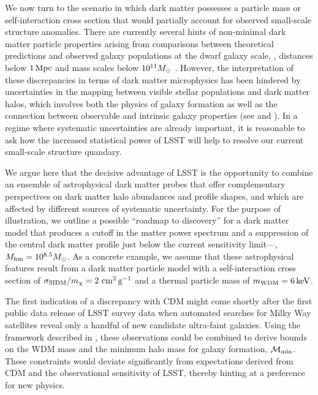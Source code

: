 We now turn to the scenario in which dark matter possesses a particle mass or self-interaction cross section that would partially account for observed small-scale structure anomalies.
There are currently several hints of non-minimal dark matter particle properties arising from comparisons between theoretical predictions and observed galaxy populations at the dwarf galaxy scale, \ie, distances below $1 \mathrm{\,Mpc}$ and mass scales below $10^{11} M_\odot$ \citep[reviewed by][]{BuckleyPeter:2017,Bullock:2017}.
However, the interpretation of these discrepancies in terms of dark matter microphysics has been hindered by uncertainties in the mapping between visible stellar populations and dark matter halos, which involves both the physics of galaxy formation as well as the connection between observable and intrinsic galaxy properties (see  and ).
In a regime where systematic uncertainties are already important, it is reasonable to ask how the increased statistical power of LSST will help to resolve our current small-scale structure quandary.

We argue here that the decisive advantage of LSST is the opportunity to combine an ensemble of astrophysical dark matter probes that offer complementary perspectives on dark matter halo abundances and profile shapes, and which are affected by different sources of systematic uncertainty.
For the purpose of illustration, we outline a possible ``roadmap to discovery'' for a dark matter model that produces a cutoff in the matter power spectrum and a suppression of the central dark matter profile just below the current sensitivity limit---\ie, $M_{\rm hm} = 10^{8.5}M_\odot$.
As a concrete example, we assume that these astrophysical features result from a dark matter particle model with a self-interaction cross section of $\sigma_{\rm SIDM}/m_\chi = 2 \mathrm{\,\mathrm{\,cm}^2\mathrm{\,g}^{-1}}$ and a thermal particle mass of $m_{\rm WDM} = 6 \mathrm{\,keV}$.

The first indication of a discrepancy with CDM might come shortly after the first public data release of LSST survey data when automated searches for Milky Way satellites reveal only a handful of new candidate ultra-faint galaxies. 
Using the framework described in , these observations could be combined to derive bounds on the WDM mass and the minimum halo mass for galaxy formation, $\mathcal{M}_{\rm min}$. These constraints would deviate significantly from expectations derived from CDM and the observational sensitivity of LSST, thereby hinting at a preference for new physics.

